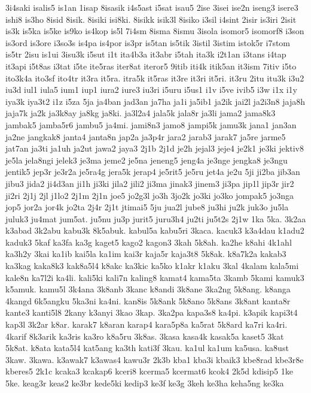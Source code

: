{3i4saki isalis5 is1an 1isap 8isasik i4s5ast i5sat isau5 2ise 3isei ise2n
iseng3 isere3 ishi8 is3ho 8isid 8isik. 8isiki isi8ki. 8isikk isik3l 8isiko
i3sil i4sint 2isir is3iri 2isit is3k is5ka is5ke is9ko is4kop is5l 7i4sm
8isma 8ismu 3isola isomor5 isomorf8 i3son is3ord is3ore i3so3s is4pa
is4por is3pr is5tan is5tik 3istil 3istim istok5r i7stom is5tr 2isu is1ui
3isu3k i5sut i1t ita4b3a it3abr i5tah ita3k i2t1an i3tans i4tap it3api
i5t8as i3tat i5te ite5ras iter8at iteror5 9itib iti4k itik5an it3ism 7itiv
i5to ito3k4a ito3sf ito4tr it3ra it5ra. itra5k it5ras it3re it3ri it5ri.
it3ru 2itu itu3k i3u2 iu3d iul1 iula5 ium1 iup1 iura2 iure3 iu3ri i5uru
i5us1 i1v i5ve ivib5 i3w i1x i1y iya3k iya3t2 i1z i5za 5ja ja4ban jad3an
ja7ha ja1i ja5ib1 ja2ik jai2l ja2i3n8 jaja8h jaja7k ja2k ja3k8ay ja8kg
ja8ki. ja3l2a4 jala5k jala8r ja3li jama2 jama8k3 jambak5 jamba5r6 jambu5
ja4mi. jami8n3 jamo8 jampi5k jamu3k jana1 jan3an ja2ne jangkak8 janta4
janta8n jap2a ja3p4r jara2 jarab3 jarak7 ja5re jarme5 jat7an ja3ti ja1uh
ja2ut jawa2 jaya3 2j1b 2j1d je2h jejal3 jeje4 je2k1 je3ki jektiv8 je5la
jela8ngi jelek3 je3ma jeme2 je5na jeneng5 jeng4a je3nge jengka8 je3ngu
jentik5 jep3r je3r2a je5ra4g jera5k jerap4 je5rit5 je5ru jet4a je2u 5ji
ji2ba jib3an jibu3 jida2 ji4d3an ji1h ji3ki jila2 jili2 ji3ma jinak3
jinem3 ji3pa jip1l jip3r jir2 ji2ri 2j1j 2jl j1lo2 2j1m 2j1n joe5 jo2g3l
jo3h 3jo2k jo3ki jo3ko jompak5 jo3nga jop5 jor2a jor4k jo2ta 2j4r 2j1t
jtimai5 5ju jua2l jube8 ju3hi ju2k juk3o ju5la juluk3 ju4mat jum5at. ju5nu
ju3p jurit5 juru3h4 ju2ti ju5t2s 2j1w 1ka 5ka. 3k2aa k3abad 3k2abu kabu3k
8k5abuk. kabul5a kabu5ri 3kaca. kacuk3 k3a4dau k1adu2 kaduk3 5kaf ka3fa
ka3g kaget5 kago2 kagon3 3kah 5k8ah. ka2he k8ahi 4k1ahl ka3h2y 3kai ka1ib
kai5la ka1im kai3r kaja5r kaja3t8 5k8ak. k8a7k2a kakab3 ka3kag kaka8k3
kak8a5l4 k8akc ka3kic ka5ko k1akr k1aku 3kal 4kalam kala5mi kale8n ka7l2i
ka4li. kali5ki kali7n kaling8 kamat4 kama5ta 3kamb 5kami kamuk3 k5amuk.
kamu5l 3k4ana 3k8anb 3kanc k8andi 3k8ane 3ka2ng 5k8ang. k8anga 4kangd
6k5angku 5ka3ni ka4ni. kan8is 5k8ank 5k8ano 5k8ans 3k8ant kanta8r kante3
kanti5l8 2kany k3anyi 3kao 3kap. 3ka2pa kapa3s8 ka4pi. k3apik kapi3t4
kap3l 3k2ar k8ar. karak7 k8aran karap4 kara5p8a ka5rat 5k8ard ka7ri ka4ri.
4karif 8k3arik ka3ris ka3ro k8a5ru 3k8as. 3kasa kasa4k kasak5a kaset5 3kat
5k8at. k8ata kata5l4 kat5ang ka3th kati3f 3kau. ka1ul ka1um ka5usa. ka8ust
3kaw. 3kawa. k3awak7 k3awas4 kawu3r 2k3b kba1 kba3i kbaik3 kbe8rad kbe3r8e
kberes5 2k1c kcaka3 kcakap6 kceri8 kcerma5 kcermat6 kcok4 2k5d kdisip5 1ke
5ke. keag3r keas2 ke3br kede5ki kedip3 ke3f ke3g 3keh ke3ha keha5ng ke3ka
}
